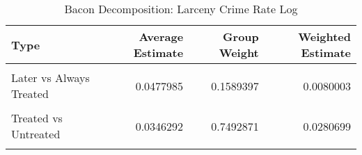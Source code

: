 \begin{table}[H]

\caption{\label{tab:tab:bacondecompositionLarceny}Bacon Decomposition: Larceny Crime Rate Log}
\centering
\begin{tabular}[t]{lrrr}
\toprule
Type & Average Estimate & Group Weight & Weighted Estimate\\
\midrule
\cellcolor{gray!6}{Earlier vs Later Treated} & \cellcolor{gray!6}{0.0088734} & \cellcolor{gray!6}{0.0683810} & \cellcolor{gray!6}{-0.0004160}\\
Later vs Always Treated & 0.0477985 & 0.1589397 & 0.0080003\\
\cellcolor{gray!6}{Later vs Earlier Treated} & \cellcolor{gray!6}{0.0616798} & \cellcolor{gray!6}{0.0233921} & \cellcolor{gray!6}{0.0004859}\\
Treated vs Untreated & 0.0346292 & 0.7492871 & 0.0280699\\
\cellcolor{gray!6}{Total TWFE} & \cellcolor{gray!6}{NaN} & \cellcolor{gray!6}{NaN} & \cellcolor{gray!6}{0.0361400}\\
\bottomrule
\end{tabular}
\end{table}
